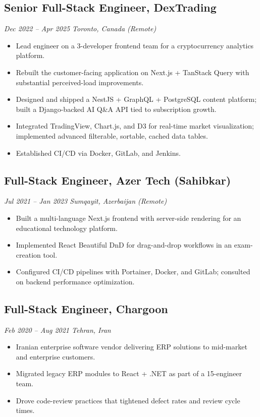 \documentclass[a4paper,10pt]{article}
\begin{document}
\subsection{Senior Full-Stack Engineer, DexTrading}
\emph{Dec 2022 -- Apr 2025 \textbar{} Toronto, Canada (Remote)}
\begin{itemize}[leftmargin=14pt,itemsep=2pt]
  \item Lead engineer on a 3-developer frontend team for a cryptocurrency analytics platform.
  \item Rebuilt the customer-facing application on Next.js + TanStack Query with substantial perceived-load improvements.
  \item Designed and shipped a NestJS + GraphQL + PostgreSQL content platform; built a Django-backed AI Q\&A API tied to subscription growth.
  \item Integrated TradingView, Chart.js, and D3 for real-time market visualization; implemented advanced filterable, sortable, cached data tables.
  \item Established CI/CD via Docker, GitLab, and Jenkins.
\end{itemize}

\subsection{Full-Stack Engineer, Azer Tech (Sahibkar)}
\emph{Jul 2021 -- Jan 2023 \textbar{} Sumqayit, Azerbaijan (Remote)}
\begin{itemize}[leftmargin=14pt,itemsep=2pt]
  \item Built a multi-language Next.js frontend with server-side rendering for an educational technology platform.
  \item Implemented React Beautiful DnD for drag-and-drop workflows in an exam-creation tool.
  \item Configured CI/CD pipelines with Portainer, Docker, and GitLab; consulted on backend performance optimization.
\end{itemize}

\subsection{Full-Stack Engineer, Chargoon}
\emph{Feb 2020 -- Aug 2021 \textbar{} Tehran, Iran}
\begin{itemize}[leftmargin=14pt,itemsep=2pt]
  \item Iranian enterprise software vendor delivering ERP solutions to mid-market and enterprise customers.
  \item Migrated legacy ERP modules to React + .NET as part of a 15-engineer team.
  \item Drove code-review practices that tightened defect rates and review cycle times.
\end{itemize}
\end{document}
